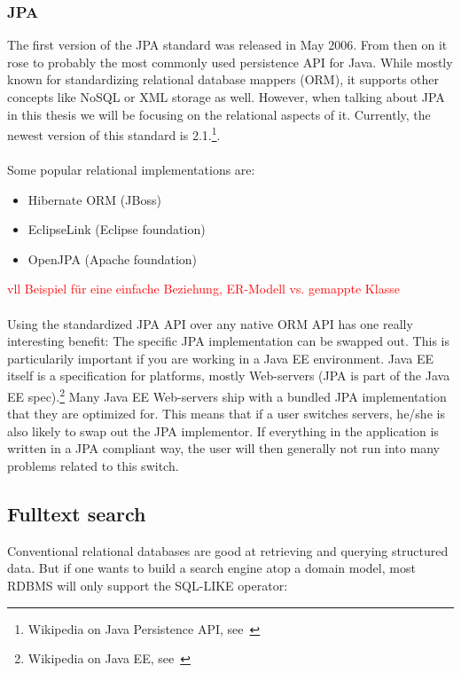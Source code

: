 \subsubsection{JPA}

The first version of the JPA standard was released in May 2006. From then on it rose to probably the most commonly used persistence API for Java. While mostly known for standardizing relational database mappers (ORM), it supports other concepts like NoSQL or XML storage as well. However, when talking about JPA in this thesis we will be focusing on the relational aspects of it. Currently, the newest version of this standard is 2.1.\footnote{Wikipedia on Java Persistence API, see~\cite{wiki_jpa}}.
\\\\
Some popular relational implementations are:
\begin{itemize}
	\item Hibernate ORM (JBoss)
	\item EclipseLink (Eclipse foundation)
	\item OpenJPA (Apache foundation)
\end{itemize}
\textcolor{red}{vll Beispiel für eine einfache Beziehung, ER-Modell vs. gemappte Klasse}
\\\\
Using the standardized JPA API over any native ORM API has one really interesting benefit:
The specific JPA implementation can be swapped out. This is particularily important if you are working in a Java EE environment. Java EE itself is a specification for platforms, mostly Web-servers (JPA is part of the Java EE spec).\footnote{Wikipedia on Java EE, see~\cite{wiki_java_ee}} Many Java EE Web-servers ship with a bundled JPA implementation that they are optimized for. This means that if a user switches servers, he/she is also likely to swap out the JPA implementor. If everything in the application is written in a JPA compliant way, the user will then generally not run into many problems related to this switch.

\subsection{Fulltext search}

Conventional relational databases are good at retrieving and querying structured data. But if one wants to build a search engine atop a domain model, most RDBMS will only support the SQL-LIKE operator:\\

